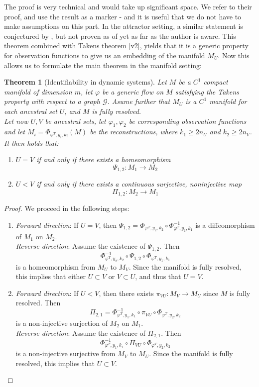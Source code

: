 \documentclass[11pt, a4paper]{memoir}
\theoremstyle{break}
\newtheorem{thm}{Theorem}
\theoremstyle{break}
\theoremstyle{nonumberplain}
\newtheorem{proof}{Proof}
\begin{document}
The proof is very technical and would take up significant space. We refer to their proof, and use the result as a marker - and it is useful that we do not have to make assumptions on this part. In the attractor setting, a similar statement is conjectured by \cite{mathFound}, but not proven as of yet as far as the author is aware. This theorem combined with Takens theorem \ref{v2}, yields that it is a generic property for observation functions to give us an embedding of the manifold $M_U$. Now this allows us to formulate the main theorem in the manifold setting:
\begin{thm}[Identifiability in dynamic systems]
Let $M$ be a $C^1$ compact manifold of dimension $m$, let $\varphi$ be a generic flow on $M$ satisfying the Takens property with respect to a graph $\mathcal{G}$. Asume further that $M_U$ is a $C^1$ manifold for each ancestral set $U$, and $M$ is fully resolved.\\[5pt]
Let now $U,V$ be ancestral sets, let $\varphi_1,\varphi_2$ be corresponding observation functions and let $M_i=\Phi_{\varphi^T,y_i,k_i}(M)$ be the reconstructions, where $k_1\geqslant 2n_U$ and $k_2\geqslant 2n_V$. It then holds that:
\begin{enumerate}[label=\roman*.]
	\item $U=V$ if and only if there exists a homeomorphism
	$$\Psi_{1,2}:M_1\to M_2$$
	\item $U<V$ if and only if there exists a continuous surjective, noninjective map
	$$\Pi_{1,2}:M_2\to M_1$$ 
\end{enumerate}
\end{thm}
\begin{proof}
We proceed in the following steps:
\begin{enumerate}[label=\roman*.]
	\item \textit{Forward direction}: If $U=V$, then $\Psi_{1,2}=\Phi_{\varphi^T,y_2,k_2}\circ \Phi_{\varphi^T,y_1,k_1}^{-1}$ is a diffeomorphism of $M_1$ on $M_2$.\\[5pt]
	\textit{Reverse direction}: Assume the existence of $\Psi_{1,2}$. Then
	$$\Phi_{\varphi^T,y_2,k_2}^{-1}\circ \Psi_{1,2} \circ \Phi_{\varphi^T,y_1,k_1}$$
	is a homeomorphism from $M_U$ to $M_V$. Since the manifold is fully resolved, this implies that either $U\subset V$ or $V\subset U$, and thus that $U=V$.
	\item \textit{Forward direction}: If $U<V$, then there exists $\pi_{VU}:M_V\to M_U$ since $M$ is fully resolved. Then
	$$\Pi_{2,1}=\Phi_{\varphi^T,y_1,k_1}^{-1}\circ\pi_{VU}\circ \Phi_{\varphi^T,y_2,k_2} $$ is a non-injective surjection of $M_2$ on $M_1$.\\[5pt]
	\textit{Reverse direction}: Assume the existence of $\Pi_{2,1}$. Then
	$$\Phi_{\varphi^T,y_1,k_1}^{-1} \circ\Pi_{VU}\circ  \Phi_{\varphi^T,y_2,k_2} $$
	is a non-injective surjective from $M_V$ to $M_U$. Since the manifold is fully resolved, this implies that $U\subset V$.
\end{enumerate}

\end{proof}
\end{document}
